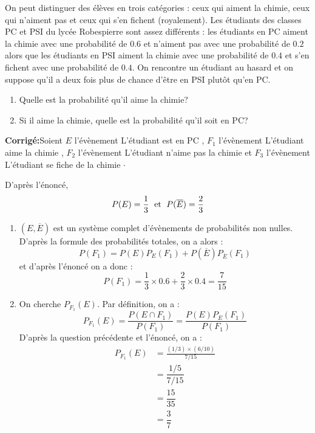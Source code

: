 \documentclass[a4paper,twoside,french,10pt]{VcCours}
\newcommand{\corr}{\textbf{Corrigé:}}
\begin{document}
\begin{Exercice}{} On peut distinguer des élèves en trois catégories : ceux qui aiment la chimie, ceux qui n'aiment pas et ceux qui s'en fichent (royalement). Les étudiants des classes PC et PSI du lycée Robespierre sont assez différents : les étudiants en PC aiment la chimie avec une probabilité de $0.6$ et n'aiment pas avec une probabilité de $0.2$ alors que les étudiants en PSI aiment la chimie avec une probabilité de $0.4$ et s'en fichent avec une probabilité de $0.4$. On rencontre un étudiant au hasard et on suppose qu'il a deux fois plus de chance d'être en PSI plutôt qu'en PC.

\begin{enumerate}
\item Quelle est la probabilité qu'il aime la chimie?
\item Si il aime la chimie, quelle est la probabilité qu'il soit en PC?
\end{enumerate}
\end{Exercice}

\corr Soient $E$ l'évènement \og L'étudiant est en PC \fg , $F_1$ l'évènement \og L'étudiant aime la chimie \fg , $F_2$ l'évènement \og L'étudiant n'aime pas la chimie \fg et $F_3$ l'évènement \og L'étudiant se fiche de la chimie \fg $\cdot$



\noindent D'après l'énoncé,
$$ P(E) = \dfrac{1}{3} \; \hbox{ et } \; P(\overline{E}) = \dfrac{2}{3}$$
\begin{enumerate}
\item $(E, \overline{E})$ est un système complet d'évènements de probabilités non nulles. D'après la formule des probabilités totales, on a alors :
\[ P(F_1) = P(E) P_E(F_1) + P(\overline{E})P_{\overline{E}}(F_1) \]
et d'après l'énoncé on a donc :
\[ P(F_1) = \dfrac{1}{3} \times 0.6 + \dfrac{2}{3} \times 0.4 = \dfrac{7}{15} \]
\item On cherche $P_{F_1}(E)$. Par définition, on a :
\[ P_{F_1}(E) = \frac{P(E \cap F_1)}{P(F_1)} = \frac{P(E) P_E(F_1)}{P(F_1)} \]
D'après la question précédente et l'énoncé, on a :
\begin{align*}
P_{F_1}(E) & = \frac{(1/3) \times (6/10)}{7/15} \\
& = \dfrac{1/5}{7/15} \\
& = \dfrac{15}{35} \\
& = \dfrac{3}{7}
\end{align*}
\end{enumerate}
\end{document}
